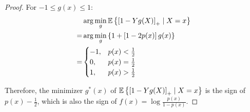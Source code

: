 \begin{proof}
	For \(-1 \leq g(x) \leq 1\):
	\begin{equation*}
		\begin{aligned}
			  & \arg\min_{g} \mathbb{E}\left\{\left[1 - Yg(X)\right]_{+} \mid X = x\right\} \\
			= & \arg\min_{g} \left\{1 + \left[1 - 2p(x)\right] g(x)\right\}           \\
			= & \begin{cases}
				    -1, & p(x) < \frac{1}{2} \\
				    0,  & p(x) = \frac{1}{2} \\
				    1,  & p(x) > \frac{1}{2}
			    \end{cases}
		\end{aligned}
	\end{equation*}

	Therefore, the minimizer \(g^*(x)\) of \(\mathbb{E}\left\{\left[1 - Yg(X)\right]_{+} \mid X = x\right\}\) is the sign of \(p(x) - \frac{1}{2}\), which is also the sign of \(f(x) = \log \frac{p(x)}{1 - p(x)}\).
\end{proof}
